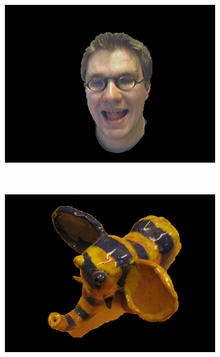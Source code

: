 \documentclass[10pt,twocolumn,letterpaper]{article}
\begin{document}
\begin{figure}[t]
\begin{subfigure}[b]{0.15\textwidth}
                \includegraphics[width=\textwidth]{figures/segmentations/person8.png}
        \end{subfigure}%
        ~
        \begin{subfigure}[b]{0.15\textwidth}
                \includegraphics[width=\textwidth]{figures/segmentations/ceramic.png}
        \end{subfigure}%
        ~
        \begin{subfigure}[b]{0.15\textwidth}

\end{subfigure}
\end{figure}
\end{document}
